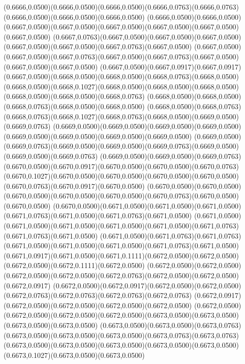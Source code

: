 (0.6666,0.0500)(0.6666,0.0500)(0.6666,0.0500)(0.6666,0.0763)(0.6666,0.0763)(0.6666,0.0500)(0.6666,0.0500)(0.6666,0.0500)
(0.6666,0.0500)(0.6666,0.0500)(0.6667,0.0500)(0.6667,0.0500)(0.6667,0.0500)(0.6667,0.0500)(0.6667,0.0500)(0.6667,0.0500)
(0.6667,0.0763)(0.6667,0.0500)(0.6667,0.0500)(0.6667,0.0500)(0.6667,0.0500)(0.6667,0.0500)(0.6667,0.0763)(0.6667,0.0500)
(0.6667,0.0500)(0.6667,0.0500)(0.6667,0.0763)(0.6667,0.0500)(0.6667,0.0763)(0.6667,0.0500)(0.6667,0.0500)(0.6667,0.0500)
(0.6667,0.0500)(0.6667,0.0917)(0.6667,0.0917)(0.6667,0.0500)(0.6668,0.0500)(0.6668,0.0500)(0.6668,0.0763)(0.6668,0.0500)
(0.6668,0.0500)(0.6668,0.1027)(0.6668,0.0500)(0.6668,0.0500)(0.6668,0.0500)(0.6668,0.0500)(0.6668,0.0500)(0.6668,0.0763)
(0.6668,0.0500)(0.6668,0.0500)(0.6668,0.0763)(0.6668,0.0500)(0.6668,0.0500)
\PST@Solid(0.6668,0.0500)(0.6668,0.0763)(0.6668,0.0763)(0.6668,0.1027)(0.6668,0.0763)(0.6668,0.0500)(0.6669,0.0500)(0.6669,0.0763)
(0.6669,0.0500)(0.6669,0.0500)(0.6669,0.0500)(0.6669,0.0500)(0.6669,0.0500)(0.6669,0.0500)(0.6669,0.0500)(0.6669,0.0500)
(0.6669,0.0500)(0.6669,0.0763)(0.6669,0.0500)(0.6669,0.0500)(0.6669,0.0763)(0.6669,0.0500)(0.6669,0.0500)(0.6669,0.0763)
(0.6669,0.0500)(0.6669,0.0500)(0.6669,0.0763)(0.6670,0.0500)(0.6670,0.0917)(0.6670,0.0500)(0.6670,0.0500)(0.6670,0.0763)
(0.6670,0.1027)(0.6670,0.0500)(0.6670,0.0500)(0.6670,0.0500)(0.6670,0.0500)(0.6670,0.0763)(0.6670,0.0917)(0.6670,0.0500)
(0.6670,0.0500)(0.6670,0.0500)(0.6670,0.0500)(0.6670,0.0500)(0.6670,0.0500)(0.6670,0.0763)(0.6670,0.0500)(0.6670,0.0500)
(0.6670,0.0500)(0.6671,0.0500)(0.6671,0.0500)(0.6671,0.0500)(0.6671,0.0763)(0.6671,0.0500)(0.6671,0.0763)(0.6671,0.0500)
(0.6671,0.0500)(0.6671,0.0500)(0.6671,0.0500)(0.6671,0.0500)(0.6671,0.0500)(0.6671,0.0763)(0.6671,0.0763)(0.6671,0.0500)
(0.6671,0.0500)(0.6671,0.0763)(0.6671,0.0763)(0.6671,0.0500)(0.6671,0.0500)(0.6671,0.0500)(0.6671,0.0763)(0.6671,0.0500)
(0.6671,0.0917)(0.6671,0.0500)(0.6671,0.1111)(0.6672,0.0500)(0.6672,0.0500)(0.6672,0.0500)(0.6672,0.1111)(0.6672,0.0500)
(0.6672,0.0500)(0.6672,0.0500)(0.6672,0.0500)(0.6672,0.0500)(0.6672,0.0763)(0.6672,0.0500)(0.6672,0.0500)(0.6672,0.0917)
(0.6672,0.0500)(0.6672,0.0917)(0.6672,0.0500)(0.6672,0.0500)(0.6672,0.0763)(0.6672,0.0763)(0.6672,0.0763)(0.6672,0.0763)
(0.6672,0.0917)(0.6672,0.0500)(0.6672,0.0500)(0.6672,0.0500)(0.6672,0.0500)
\PST@Solid(0.6672,0.0500)(0.6672,0.0500)(0.6672,0.0500)(0.6672,0.0500)(0.6673,0.0500)(0.6673,0.0500)(0.6673,0.0500)(0.6673,0.0500)
(0.6673,0.0500)(0.6673,0.0500)(0.6673,0.0763)(0.6673,0.0500)(0.6673,0.0500)(0.6673,0.0500)(0.6673,0.0763)(0.6673,0.0763)
(0.6673,0.0500)(0.6673,0.0500)(0.6673,0.0500)(0.6673,0.0500)(0.6673,0.0500)(0.6673,0.1027)(0.6673,0.0500)(0.6673,0.0500)
